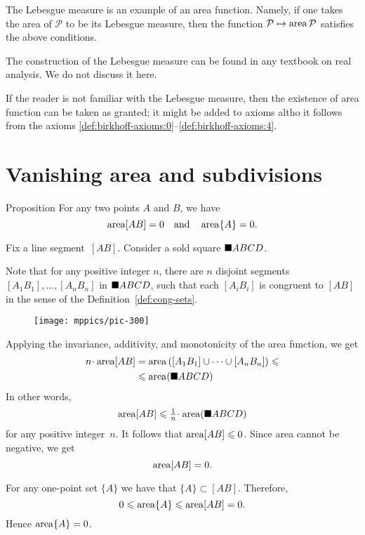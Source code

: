 {The Lebesgue measure is an example of an area function. 
Namely, if one takes the area of $\mathcal{P}$ to be its Lebesgue measure,
then the function $\mathcal{P}\mapsto\mathop{\rm area}\nolimits\mathcal{P}$ satisfies the above conditions.

The construction of the Lebesgue measure can be found in any textbook on real analysis.
We do not discuss it here.

If the reader is not familiar with the Lebesgue measure, then the existence of area function can be taken as granted; 
it might be added to axioms altho it follows from the axioms \ref{def:birkhoff-axioms:0}--\ref{def:birkhoff-axioms:4}.

\section{Vanishing area and subdivisions}

\begin{thm}{Proposition}\label{prop:area-segment}
For any two points $A$ and $B$, we have
\[\mathop{\rm area}\nolimits[AB]=0\quad\text{and}\quad\mathop{\rm area}\nolimits\{A\}=0.\]
\end{thm}

Fix a line segment~$[AB]$.
Consider a sold square $\blacksquare ABCD$.

Note that for any positive integer $n$,
there are $n$ disjoint segments $[A_1B_1],\dots,[A_nB_n]$ 
in $\blacksquare ABCD$,
such that each $[A_iB_i]$ is congruent to $[AB]$ in the sense of the Definition~\ref{def:cong-sets}.

\begin{wrapfigure}[10]{o}{37 mm}
\vskip-2mm
\centering
\texttt{[image: mppics/pic-300]}
\vskip0mm
\end{wrapfigure}

Applying the invariance, additivity, and monotonicity of the area function, 
we get
\begin{align*}
n\cdot \area[AB]
&=\area\left([A_1B_1]\cup\dots\cup[A_nB_n]\right)\le
\\
&\le \area(\solidsquare ABCD)              
\end{align*}
In other words,
\[\area[AB]\le \tfrac1n\cdot\area(\solidsquare ABCD)\] 
for any positive integer~$n$.
It follows that $\mathop{\rm area}\nolimits[AB]\leqslant 0$. 
Since area cannot be negative, we get
\[\mathop{\rm area}\nolimits[AB]= 0.\]

For any one-point set $\{A\}$ 
we have that $\{A\}\subset [AB]$.
Therefore, 
\[0\leqslant \mathop{\rm area}\nolimits\{A\}\leqslant \mathop{\rm area}\nolimits[AB]=0.\]
Hence $\mathop{\rm area}\nolimits\{A\}=0$.
\qeds

}
